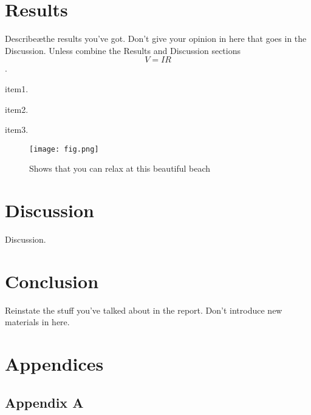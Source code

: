 \documentclass[a4paper, 11pt]{article}
\newcounter{foo}
\begin{document}
\section{Results}\label{sec:res}
    Describe\ae the results you've got. Don't give your opinion in here that goes in the Discussion.
    Unless combine the Results and Discussion sections \begin{equation} V = IR\end{equation}.

    \begin{list}{S-}{}
        \item item1.
        
        \item item2.
        
        \item item3.
    \end{list}

    \begin{figure}[h]
        \centering
        \graphicspath{{./wiki/}}
        \texttt{[image: fig.png]}
        \caption{Shows that you can relax at this beautiful beach}
        \label{Fig:my_label}
    \end{figure}

\section{Discussion}\label{sec:dis}
    Discussion.

\section{Conclusion}\label{sec:conc}
    Reinstate the stuff you've talked about in the report. Don't introduce new materials in here.

\pagebreak

\renewcommand{\bibname}{References}
\renewcommand{\bibsection}{\section{\bibname}}
\renewcommand{\cite}{\citep}

\pagebreak

\section{Appendices}
    \subsection{Appendix A}
\end{document}

